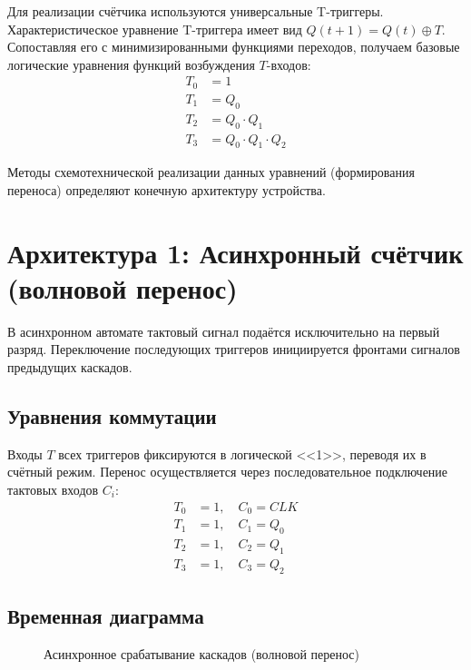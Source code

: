 \documentclass[oneside,a4paper,14pt]{extarticle}
\begin{document}
Для реализации счётчика используются универсальные T-триггеры. Характеристическое уравнение T-триггера имеет вид $Q(t+1) = Q(t) \oplus T$. Сопоставляя его с минимизированными функциями переходов, получаем базовые логические уравнения функций возбуждения $T$-входов:
\begin{align*}
  T_0 &= 1 \\
  T_1 &= Q_0 \\
  T_2 &= Q_0 \cdot Q_1 \\
  T_3 &= Q_0 \cdot Q_1 \cdot Q_2
\end{align*}

Методы схемотехнической реализации данных уравнений (формирования переноса) определяют конечную архитектуру устройства.

\section{Архитектура 1: Асинхронный счётчик (волновой перенос)}
В асинхронном автомате тактовый сигнал подаётся исключительно на первый разряд. Переключение последующих триггеров инициируется фронтами сигналов предыдущих каскадов.

\subsection{Уравнения коммутации}
Входы $T$ всех триггеров фиксируются в логической <<1>>, переводя их в счётный режим. Перенос осуществляется через последовательное подключение тактовых входов $C_i$:
\begin{align*}
  T_0 &= 1, \quad C_0 = CLK \\
  T_1 &= 1, \quad C_1 = Q_0 \\
  T_2 &= 1, \quad C_2 = Q_1 \\
  T_3 &= 1, \quad C_3 = Q_2
\end{align*}

\subsection{Временная диаграмма}
\begin{figure}[H]
  \centering
  \caption{Асинхронное срабатывание каскадов (волновой перенос)}
\end{figure}
\end{document}
